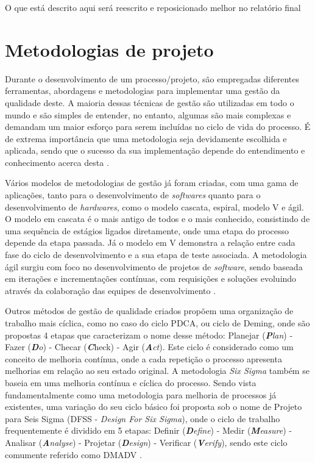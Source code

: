 \label{A arrumar}
O que está descrito aqui será reescrito e reposicionado melhor no relatório final


\section{Metodologias de projeto}
\label{sec:Fundamentos-Metodologias}

Durante o desenvolvimento de um processo/projeto, são empregadas diferentes ferramentas, abordagens e metodologias para implementar uma gestão da qualidade
deste. A maioria dessas técnicas de gestão são utilizadas em todo o mundo e são simples de entender, no entanto, algumas são mais complexas e demandam um 
maior esforço para serem incluídas no ciclo de vida do processo. É de extrema importância que uma metodologia seja devidamente escolhida e aplicada, 
sendo que o sucesso da sua implementação depende do entendimento e conhecimento acerca desta \cite{sokovic2010quality}.

Vários modelos de metodologias de gestão já foram criadas, com uma gama de aplicações, tanto para o desenvolvimento de \textit{softwares} quanto para o 
desenvolvimento de \textit{hardwares}, como o modelo cascata, espiral, modelo V e ágil. O modelo em cascata é o mais antigo de todos e o mais conhecido,
consistindo de uma sequência de estágios ligados diretamente, onde uma etapa do processo depende da etapa passada. Já o modelo em V demonstra a relação
entre cada fase do ciclo de desenvolvimento e a sua etapa de teste associada. A metodologia ágil surgiu com foco no desenvolvimento de projetos de 
\textit{software}, sendo baseada em iterações e incrementações contínuas, com requisições e soluções evoluindo através da colaboração das equipes
de desenvolvimento \cite{balaji2012waterfall}.

Outros métodos de gestão de qualidade criados propõem uma organização de trabalho mais cíclica, como no caso do ciclo PDCA, ou ciclo de Deming, onde são propostas 4 etapas
que caracterizam o nome desse método: Planejar (\textit{\textbf{P}lan}) - Fazer (\textit{\textbf{D}o}) - Checar (\textit\textbf{C}heck) - Agir (\textit{\textbf{A}ct}).
Este ciclo é considerado como um conceito de melhoria contínua, onde a cada repetição o processo apresenta melhorias em relação ao seu estado original. A metodologia
\textit{Six Sigma} também se baseia em uma melhoria contínua e cíclica do processo. Sendo vista fundamentalmente como uma metodologia para melhoria de processos
já existentes, uma variação do seu ciclo básico foi proposta sob o nome de Projeto para Seis Sigma (DFSS - \textit{Design For Six Sigma}), onde o ciclo de 
trabalho frequentemente é dividido em 5 etapas: Definir (\textit{\textbf{D}efine}) - Medir (\textit{\textbf{M}easure}) - Analisar (\textit{\textbf{A}nalyse}) -
Projetar (\textit{\textbf{D}esign}) - Verificar (\textit{\textbf{V}erify}), sendo este ciclo comumente referido como DMADV \cite{sokovic2010quality}.

